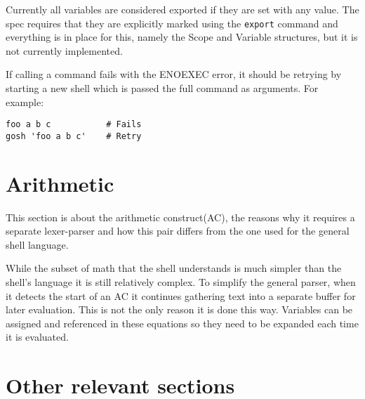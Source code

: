 Currently all variables are considered exported if they are set with any value.
The spec requires that they are explicitly marked using the \verb!export! command and everything is in place for this, namely the Scope and Variable structures, but it is not currently implemented.

If calling a command fails with the ENOEXEC error, it should be retrying by starting a new shell which is passed the full command as arguments. For example:
\begin{verbatim}
foo a b c           # Fails
gosh 'foo a b c'    # Retry
\end{verbatim}

\section{Arithmetic}
This section is about the arithmetic construct(AC), the reasons why it requires a separate lexer-parser and how this pair differs from the one used for the general shell language.

While the subset of math that the shell understands is much simpler than the shell's language it is still relatively complex. 
To simplify the general parser, when it detects the start of an AC it continues gathering text into a separate buffer for later evaluation.
This is not the only reason it is done this way.
Variables can be assigned and referenced in these equations so they need to be expanded each time it is evaluated.






\section{Other relevant sections}